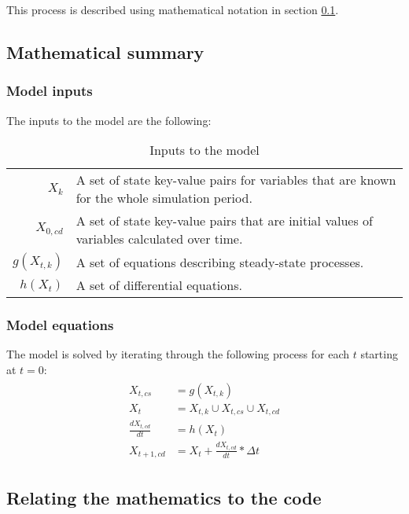 \documentclass{article}
\makeatletter
\newenvironment{descriptions}
  {\par\vspace{\abovedisplayskip}\begin{tabular}{>{$}r<{$} @{$:{}$} l}}
  {\end{tabular}\par\vspace{\belowdisplayskip}}
\makeatother
\begin{document}
This process is described using mathematical notation in section \ref{sec:math_summary}.

\subsection{Mathematical summary}
\label{sec:math_summary}

\subsubsection{Model inputs}
\label{sec:model_inputs}
The inputs to the model are the following:

\begin{table}[!htbp]
\begin{center}
\begin{descriptions}
	X_k & A set of state key-value pairs for variables that are known for the whole simulation period. \\
	X_{0,cd} & A set of state key-value pairs that are initial values of variables calculated over time. \\
	g(X_{t,k}) & A set of equations describing steady-state processes. \\
	h(X_{t}) & A set of differential equations. \\
\end{descriptions}
\caption{\label{tab:model_inputs}Inputs to the model}
\end{center}
\end{table}

\subsubsection{Model equations}
\label{sec:model_equations}
The model is solved by iterating through the following process for each $t$ starting at $t = 0$:
\begin{align}
\label{eq:solver_loop}
\begin{split}
	X_{t,cs} &= g(X_{t,k}) \\
    X_t &= X_{t,k}  \cup X_{t,cs} \cup X_{t,cd} \\
    \frac{dX_{t,cd}}{dt} &= h(X_{t})  \\
    X_{t+1,cd} &= X_{t} + \frac{dX_{t,cd}}{dt} * \Delta t
\end{split}
\end{align}

\subsection{Relating the mathematics to the code}
\end{document}
